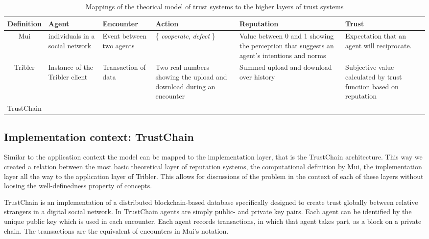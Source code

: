 \begin{table}
    \centering
    \caption{Mappings of the theorical model of trust systems to the higher layers of trust systems}
    \label{tab:layersofreputation}
    \begin{tabular}[]{|c|p{2cm}|p{2cm}|p{2cm}|p{2cm}|p{2cm}|} \hline
        Definition & Agent                           & Encounter & Action & Reputation & Trust \\ \hline \hline
        Mui        & individuals in a social network & Event between two agents & \{ \textit{cooperate}, \textit{defect} \} & Value between 0 and 1 showing the perception that suggests an agent's intentions and norms & Expectation that an agent will reciprocate. \\ \hline
        Tribler    & Instance of the Tribler client  & Transaction of data &  Two real numbers showing the upload and download during an encounter & Summed upload and download over history & Subjective value calculated by trust function based on reputation \\ \hline
        TrustChain & & & & & \\ \hline
    \end{tabular}
\end{table}

\subsection{Implementation context: TrustChain}
Similar to the application context the model can be mapped to the implementation layer, that is the 
TrustChain architecture. This way we created a relation between the most basic theoretical layer
of reputation systems, the computational definition by Mui, the implementation layer all the way to
the application layer of Tribler. This allows for discussions of the problem in the context of each 
of these layers without loosing the well-definedness property of concepts.

TrustChain is an implementation of a distributed blockchain-based database specifically designed to create trust 
globally between relative strangers in a digital social network. In TrustChain agents are simply public- 
and private key pairs. Each agent can be identified by the unique public key which is used in each
encounter. Each agent records transactions, in which that agent takes part, as a block on a private 
chain. The transactions are the equivalent of encounters in Mui's notation.

